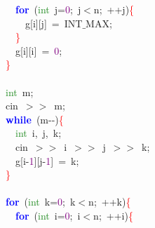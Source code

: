 \mbox{}\ \ \ \ \ \ \textbf{\textcolor{Blue}{for}}\ \textcolor{BrickRed}{(}\textcolor{ForestGreen}{int}\ j\textcolor{BrickRed}{=}\textcolor{Purple}{0}\textcolor{BrickRed}{;}\ j\textcolor{BrickRed}{$<$}n\textcolor{BrickRed}{;}\ \textcolor{BrickRed}{++}j\textcolor{BrickRed}{)}\textcolor{Red}{\{} \\
\mbox{}\ \ \ \ \ \ \ \ g\textcolor{BrickRed}{[}i\textcolor{BrickRed}{][}j\textcolor{BrickRed}{]}\ \textcolor{BrickRed}{=}\ INT$\_$MAX\textcolor{BrickRed}{;} \\
\mbox{}\ \ \ \ \ \ \textcolor{Red}{\}} \\
\mbox{}\ \ \ \ \ \ g\textcolor{BrickRed}{[}i\textcolor{BrickRed}{][}i\textcolor{BrickRed}{]}\ \textcolor{BrickRed}{=}\ \textcolor{Purple}{0}\textcolor{BrickRed}{;} \\
\mbox{}\ \ \ \ \textcolor{Red}{\}} \\
\mbox{} \\
\mbox{}\ \ \ \ \textcolor{ForestGreen}{int}\ m\textcolor{BrickRed}{;} \\
\mbox{}\ \ \ \ cin\ \textcolor{BrickRed}{$>$$>$}\ m\textcolor{BrickRed}{;} \\
\mbox{}\ \ \ \ \textbf{\textcolor{Blue}{while}}\ \textcolor{BrickRed}{(}m\textcolor{BrickRed}{-\/-)}\textcolor{Red}{\{} \\
\mbox{}\ \ \ \ \ \ \textcolor{ForestGreen}{int}\ i\textcolor{BrickRed}{,}\ j\textcolor{BrickRed}{,}\ k\textcolor{BrickRed}{;} \\
\mbox{}\ \ \ \ \ \ cin\ \textcolor{BrickRed}{$>$$>$}\ i\ \textcolor{BrickRed}{$>$$>$}\ j\ \textcolor{BrickRed}{$>$$>$}\ k\textcolor{BrickRed}{;} \\
\mbox{}\ \ \ \ \ \ g\textcolor{BrickRed}{[}i\textcolor{BrickRed}{-}\textcolor{Purple}{1}\textcolor{BrickRed}{][}j\textcolor{BrickRed}{-}\textcolor{Purple}{1}\textcolor{BrickRed}{]}\ \textcolor{BrickRed}{=}\ k\textcolor{BrickRed}{;} \\
\mbox{}\ \ \ \ \textcolor{Red}{\}} \\
\mbox{} \\
\mbox{}\ \ \ \ \textbf{\textcolor{Blue}{for}}\ \textcolor{BrickRed}{(}\textcolor{ForestGreen}{int}\ k\textcolor{BrickRed}{=}\textcolor{Purple}{0}\textcolor{BrickRed}{;}\ k\textcolor{BrickRed}{$<$}n\textcolor{BrickRed}{;}\ \textcolor{BrickRed}{++}k\textcolor{BrickRed}{)}\textcolor{Red}{\{} \\
\mbox{}\ \ \ \ \ \ \textbf{\textcolor{Blue}{for}}\ \textcolor{BrickRed}{(}\textcolor{ForestGreen}{int}\ i\textcolor{BrickRed}{=}\textcolor{Purple}{0}\textcolor{BrickRed}{;}\ i\textcolor{BrickRed}{$<$}n\textcolor{BrickRed}{;}\ \textcolor{BrickRed}{++}i\textcolor{BrickRed}{)}\textcolor{Red}{\{} \\
